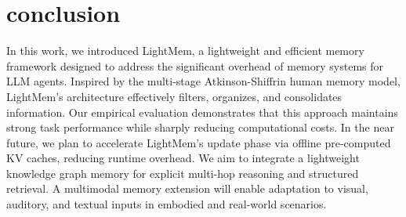 \section{conclusion}
In this work, we introduced LightMem, a lightweight and efficient memory framework designed to address the significant overhead of memory systems for LLM agents.
Inspired by the multi-stage Atkinson-Shiffrin human memory model, LightMem's architecture effectively filters, organizes, and consolidates information. 
Our empirical evaluation demonstrates that this approach maintains strong task performance while sharply reducing computational costs. 
In the near future, we plan to accelerate LightMem’s update phase via offline pre-computed KV caches, reducing runtime overhead. We aim to integrate a lightweight knowledge graph memory for explicit multi-hop reasoning and structured retrieval. A multimodal memory extension will enable adaptation to visual, auditory, and textual inputs in embodied and real-world scenarios.







